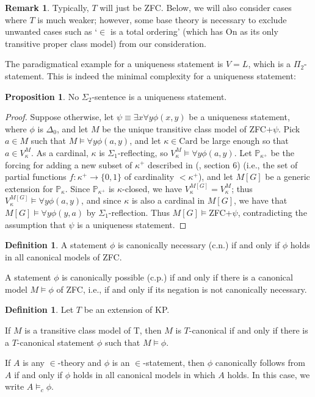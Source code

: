 \documentclass[a4paper,12pt]{amsart}
\theoremstyle{definition}
\newtheorem{prop}[fact]{Proposition}
\newtheorem{defini}[fact]{Definition}
\newtheorem{remark}[fact]{Remark}
\begin{document}
\begin{remark} Typically, $T$ will just be ZFC. Below, we will also consider cases where $T$ is much weaker; however, some base theory is necessary to exclude unwanted cases such as `$\in$ is a total ordering' (which has $\text{On}$ as its only transitive proper class model) from our consideration. 
\end{remark}

The paradigmatical example for a uniqueness statement is $V=L$, which is a $\Pi_2$-statement. This is indeed the minimal complexity for a uniqueness statement:

\begin{prop}
No $\Sigma_2$-sentence is a uniqueness statement.
\end{prop}
\begin{proof}
Suppose otherwise, let $\psi\equiv\exists{x}\forall{y}\phi(x,y)$ be a uniqueness statement, where $\phi$ is $\Delta_0$, and let $M$ be the unique transitive class model of ZFC+$\psi$. Pick $a\in M$ such that $M\models\forall{y}\phi(a,y)$, and let $\kappa\in\text{Card}$ be large enough so that $a\in V_{\kappa}^{M}$. As a cardinal, $\kappa$ is $\Sigma_1$-reflecting, so $V_{\kappa}^{M}\models\forall{y}\phi(a,y)$. 
Let $\mathbb{P}_{\kappa^{+}}$ be the forcing for adding a new subset of $\kappa^+$ described in (\cite{Kunen}, section $6$) (i.e., the set of partial functions $f:\kappa^{+}\rightarrow\{0,1\}$ of cardinality $<\kappa^{+}$), and let $M[G]$ be a generic extension for $\mathbb{P}_{\kappa}$. Since $\mathbb{P}_{\kappa^{+}}$ is $\kappa$-closed, we have $V^{M[G]}_{\kappa}=V^{M}_{\kappa}$; thus $V^{M[G]}_{\kappa}\models\forall{y}\phi(a,y)$, and since $\kappa$ is also a cardinal in $M[G]$, we have that $M[G]\models\forall{y}\phi(y,a)$ by $\Sigma_1$-reflection. Thus $M[G]\models$ZFC+$\psi$, contradicting the assumption that $\psi$ is a uniqueness statement.
\end{proof}

\begin{defini}
A statement $\phi$ is canonically necessary (c.n.) if and only if $\phi$ holds in all canonical models of ZFC.

A statement $\phi$ is canonically possible (c.p.) if and only if there is a canonical model $M\models\phi$ of ZFC, i.e., if and only if its negation is not canonically necessary. 

\end{defini}


\begin{defini}
Let $T$ be an extension of KP.

If $M$ is a transitive class model of T, then $M$ is $T$-canonical if 
and only if there is a $T$-canonical statement $\phi$ such that $M\models\phi$.

If $A$ is any $\in$-theory and $\phi$ is an $\in$-statement, 
then $\phi$ canonically follows from $A$ if and only if $\phi$ holds in all canonical models in which $A$ holds. In this case, we write $A\models_{c}\phi$.
\end{defini}
\end{document}
